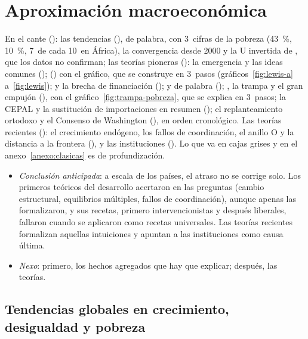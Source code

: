 \documentclass[11pt]{article}
\begin{document}
\section{Aproximación macroeconómica}\label{sec:macro}

\begin{notaopositor}
En el cante (): las tendencias (), de palabra, con 3~cifras de la pobreza (43~\%, 10~\%, 7~de cada 10~en África), la convergencia desde 2000 y la U invertida de , que los datos no confirman; las teorías pioneras (): la emergencia y las ideas comunes ();  () con el gráfico, que se construye en 3~pasos (gráficos~\ref{fig:lewis-a} a~\ref{fig:lewis});  y la brecha de financiación ();  y  de palabra (); , la trampa y el gran empujón (), con el gráfico~\ref{fig:trampa-pobreza}, que se explica en 3~pasos; la CEPAL y la sustitución de importaciones en resumen (); el replanteamiento ortodoxo y el Consenso de Washington (), en orden cronológico. Las teorías recientes (): el crecimiento endógeno, los fallos de coordinación, el anillo O y la distancia a la frontera (), y las instituciones (). Lo que va en cajas grises y en el anexo~\ref{anexo:clasicas} es de profundización.
\end{notaopositor}

\begin{itemize}
\item \emph{Conclusión anticipada}: a escala de los países, el atraso no se corrige solo. Los primeros teóricos del desarrollo acertaron en las preguntas (cambio estructural, equilibrios múltiples, fallos de coordinación), aunque apenas las formalizaron, y sus recetas, primero intervencionistas y después liberales, fallaron cuando se aplicaron como recetas universales. Las teorías recientes formalizan aquellas intuiciones y apuntan a las instituciones como causa última.
\item \emph{Nexo}: primero, los hechos agregados que hay que explicar; después, las teorías.
\end{itemize}

\subsection{Tendencias globales en crecimiento, desigualdad y pobreza}\label{sec:tendencias}
\end{document}
